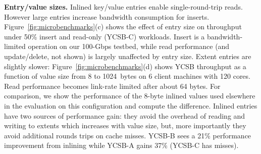 

\textbf{Entry/value sizes.} \label{sec:entry_size} 
Inlined key/value entries enable single-round-trip
reads. However large entries increase bandwidth consumption for inserts.
Figure~\ref{fig:microbenchmarks}(c) shows the effect of entry size on throughput under 50\% insert
and read-only (YCSB-C) workloads. Insert is a bandwidth-limited operation on our 100-Gbps testbed,
while read performance (and update/delete, not shown)
is largely unaffected by entry size.
%
%
Extent entries are slightly slower:
Figure~\ref{fig:microbenchmarks}(d) shows YCSB throughput as a function of
value size from 8 to 1024~bytes on 6 client machines with 120 cores.  Read performance becomes link-rate limited after about 64 bytes.
For
comparison, we show the performance of the 8-byte inlined values used elsewhere in the evaluation on this configuration and compute the difference.  
Inlined entries have two sources of performance gain: they avoid the overhead of reading and
writing to extents which increases with value size, but, more importantly they avoid additional rounds trips on cache
misses. YCSB-B sees a 21\% performance improvement from inlining while YCSB-A gains 37\% (YCSB-C has misses).



